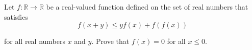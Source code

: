 Let $f : \mathbb R \to \mathbb R$ be a real-valued function defined on the set of real numbers that satisfies\[f(x + y) \leq yf(x) + f(f(x))\]

for all real numbers $x$ and $y$. Prove that $f(x) = 0$ for all $x \leq 0$.
